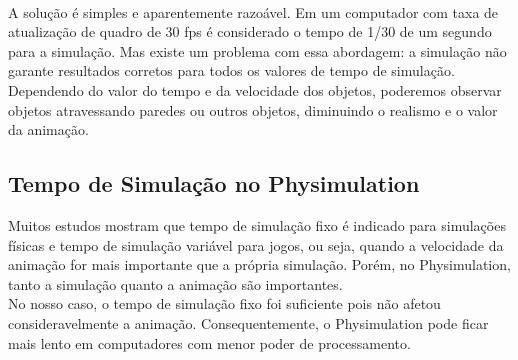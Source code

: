 \ \\
\hspace*{14pt} A solução é simples e aparentemente razoável. Em um computador com taxa de atualização de quadro de 30 fps é considerado o tempo de {1/30} de um segundo para a simulação.
Mas existe um problema com essa abordagem: a simulação não garante resultados corretos para todos os valores de tempo de simulação. 
Dependendo do valor do tempo e da velocidade dos objetos, poderemos observar objetos atravessando paredes ou outros objetos, diminuindo o realismo e o valor da animação.

\subsection{Tempo de Simulação no Physimulation}

Muitos estudos mostram que tempo de simulação fixo é indicado para simulações físicas e tempo de simulação variável para jogos, ou seja, quando a velocidade da animação for mais 
importante que a própria simulação. Porém, no Physimulation, tanto a simulação quanto a animação são importantes. \\
 
No nosso caso, o tempo de simulação fixo foi suficiente pois não afetou consideravelmente a animação. Consequentemente, o Physimulation pode ficar mais lento em computadores com menor poder de processamento.
